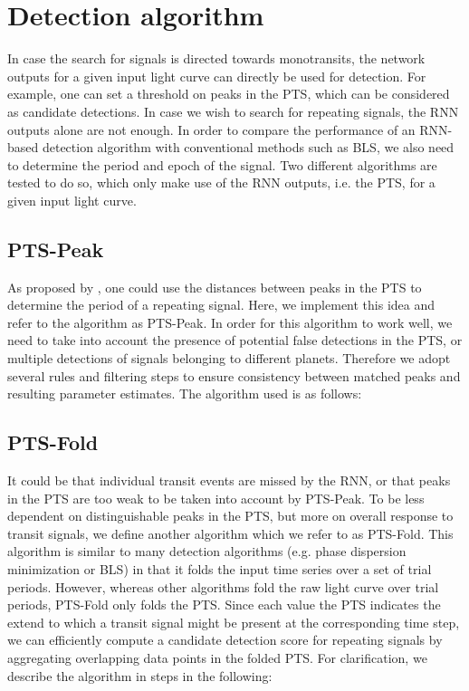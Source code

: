 
\section{Detection algorithm}
\label{sec:algorithm}

In case the search for signals is directed towards monotransits, the network outputs for a given input light curve can directly be used for detection. For example, one can set a threshold on peaks in the PTS, which can be considered as candidate detections. In case we wish to search for repeating signals, the RNN outputs alone are not enough. In order to compare the performance of an RNN-based detection algorithm with conventional methods such as BLS, we also need to determine the period and epoch of the signal. Two different algorithms are tested to do so, which only make use of the RNN outputs, i.e. the PTS, for a given input light curve. 

\subsection{PTS-Peak}
\label{sec:pts-peak}
As proposed by \cite{pearson2018searching}, one could use the distances between peaks in the PTS to determine the period of a repeating signal. Here, we implement this idea and refer to the algorithm as PTS-Peak. In order for this algorithm to work well, we need to take into account the presence of potential false detections in the PTS, or multiple detections of signals belonging to different planets. Therefore we adopt several rules and filtering steps to ensure consistency between matched peaks and resulting parameter estimates. The algorithm used is as follows:


 
\subsection{PTS-Fold}
\label{sec:pts-fold}

It could be that individual transit events are missed by the RNN, or that peaks in the PTS are too weak to be taken into account by PTS-Peak. To be less dependent on distinguishable peaks in the PTS, but more on overall response to transit signals, we define another algorithm which we refer to as PTS-Fold. This algorithm is similar to many detection algorithms (e.g. phase dispersion minimization or BLS) in that it folds the input time series over a set of trial periods. However, whereas other algorithms fold the raw light curve over trial periods, PTS-Fold only folds the PTS. Since each value the PTS indicates the extend to which a transit signal might be present at the corresponding time step, we can efficiently compute a candidate detection score for repeating signals by aggregating overlapping data points in the folded PTS. For clarification, we describe the algorithm in steps in the following:



